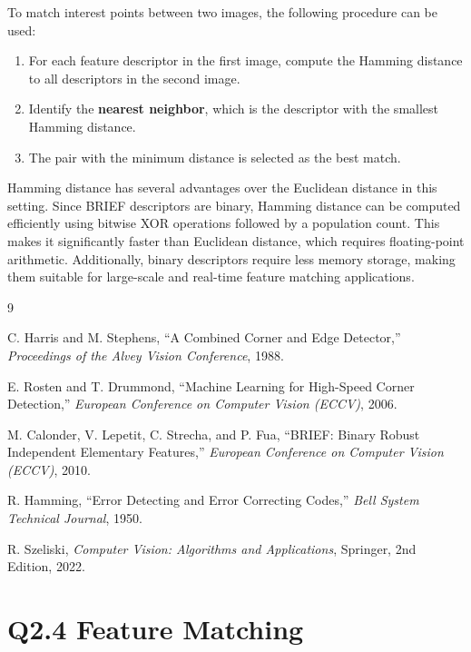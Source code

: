 \documentclass[12pt]{article}
\begin{document}
To match interest points between two images, the following procedure can be used:

\begin{enumerate}
\item For each feature descriptor in the first image, compute the Hamming distance to all descriptors in the second image.
\item Identify the \textbf{nearest neighbor}, which is the descriptor with the smallest Hamming distance.
\item The pair with the minimum distance is selected as the best match.
\end{enumerate}

Hamming distance has several advantages over the Euclidean distance in this setting. Since BRIEF descriptors are binary, Hamming distance can be computed efficiently using bitwise XOR operations followed by a population count. This makes it significantly faster than Euclidean distance, which requires floating-point arithmetic. Additionally, binary descriptors require less memory storage, making them suitable for large-scale and real-time feature matching applications.

\begin{thebibliography}{9}

C. Harris and M. Stephens,
``A Combined Corner and Edge Detector,''
\textit{Proceedings of the Alvey Vision Conference}, 1988.

E. Rosten and T. Drummond,
``Machine Learning for High-Speed Corner Detection,''
\textit{European Conference on Computer Vision (ECCV)}, 2006.

M. Calonder, V. Lepetit, C. Strecha, and P. Fua,
``BRIEF: Binary Robust Independent Elementary Features,''
\textit{European Conference on Computer Vision (ECCV)}, 2010.

R. Hamming,
``Error Detecting and Error Correcting Codes,''
\textit{Bell System Technical Journal}, 1950.

R. Szeliski,
\textit{Computer Vision: Algorithms and Applications},
Springer, 2nd Edition, 2022.

\end{thebibliography}

\newpage
\section*{Q2.4 Feature Matching}
\end{document}
